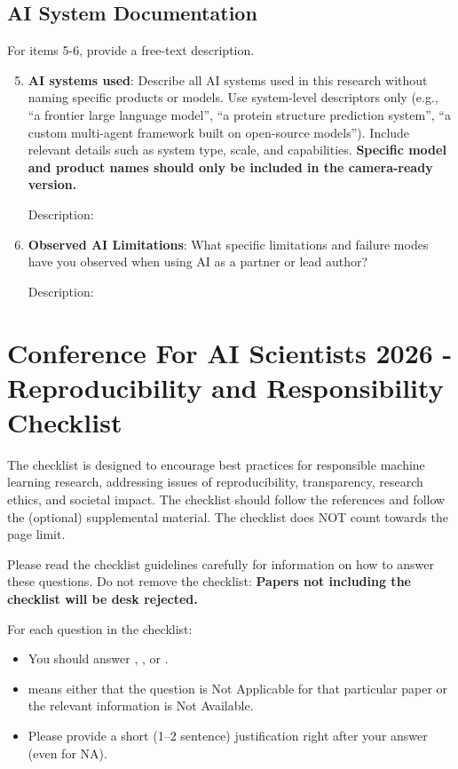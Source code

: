 \documentclass{article}
\begin{document}
\subsection*{AI System Documentation}

For items 5-6, provide a free-text description.

\begin{enumerate}
    \setcounter{enumi}{4}

    \item \textbf{AI systems used}: Describe all AI systems used in this research without naming specific products or models. Use system-level descriptors only (e.g., ``a frontier large language model'', ``a protein structure prediction system'', ``a custom multi-agent framework built on open-source models''). Include relevant details such as system type, scale, and capabilities. \textbf{Specific model and product names should only be included in the camera-ready version.}

    Description: \justificationTODO{}

    \item \textbf{Observed AI Limitations}: What specific limitations and failure modes have you observed when using AI as a partner or lead author?

    Description: \justificationTODO{}

\end{enumerate}

\newpage

\section*{Conference For AI Scientists 2026 - Reproducibility and Responsibility Checklist}
\label{checklist_reproducibility}

The checklist is designed to encourage best practices for responsible machine learning research, addressing issues of reproducibility, transparency, research ethics, and societal impact. The checklist should follow the references and follow the (optional) supplemental material. The checklist does NOT count towards the page limit. 

Please read the checklist guidelines carefully for information on how to answer these questions. Do not remove the checklist: {\bf Papers not including the checklist will be desk rejected.} 

For each question in the checklist:
\begin{itemize}
    \item You should answer \answerYes{}, \answerNo{}, or \answerNA{}.
    \item \answerNA{} means either that the question is Not Applicable for that particular paper or the relevant information is Not Available.
    \item Please provide a short (1–2 sentence) justification right after your answer (even for NA). 
\end{itemize}
\end{document}
